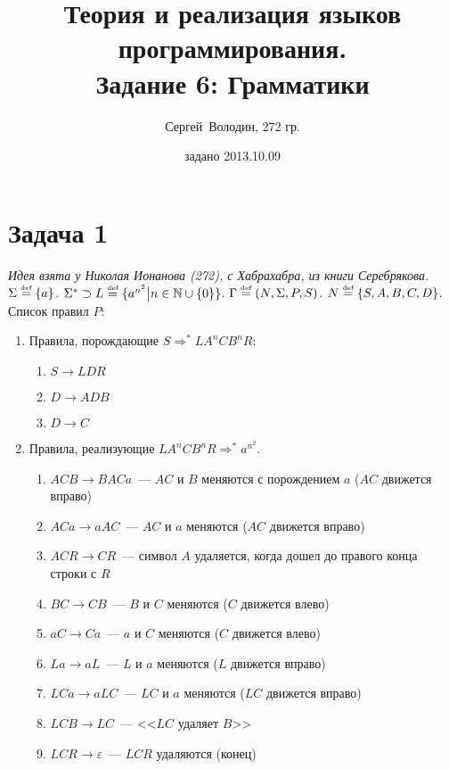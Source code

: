 \documentclass[a4paper]{article}
\title{Теория и реализация языков программирования.\\Задание 6: Грамматики}
\date{задано 2013.10.09}
\author{Сергей~Володин, 272 гр.}
\def\eqdef{\overset{\mbox{\tiny def}}{=}}
\begin{document}
\maketitle
\section*{Задача 1}
{\em Идея взята у Николая Ионанова (272), с Хабрахабра, из книги Серебрякова.}\newline
$\Sigma\eqdef\{a\}$. $\Sigma^*\supset L\eqdef\{a^{n^2}\big|n\in{\mathbb N}\cup \{0\} \}$. $\Gamma\eqdef (N,\Sigma,P,S)$. $N\eqdef \{S,A,B,C,D\}$. Список правил $P$:
\begin{enumerate}[(1)]
\item Правила, порождающие $S\Longrightarrow^* LA^nCB^nR$:\begin{enumerate}[1.]
\item \label{rS} $S\longrightarrow LDR$
\item \label{rDAB} $D\longrightarrow ADB$
\item \label{rDeps} $D\longrightarrow C$
\end{enumerate}
\item Правила, реализующие $LA^nCB^nR\Longrightarrow^* a^{n^2}$.\begin{enumerate}[1.]
\item \label{rACB} $ACB \longrightarrow BACa$~--- $AC$ и $B$ меняются с порождением $a$ ($AC$ движется вправо)
\item \label{rACa} $ACa \longrightarrow aAC$~--- $AC$ и $a$ меняются ($AC$ движется вправо)
\item \label{rACR} $ACR \longrightarrow CR$~--- символ $A$ удаляется, когда дошел до правого конца строки с $R$
\item \label{rBC} $BC \longrightarrow CB$~--- $B$ и $C$ меняются ($C$ движется влево)
\item \label{raC} $aC \longrightarrow Ca$~--- $a$ и $C$ меняются ($C$ движется влево)
\item \label{rLa} $La \longrightarrow aL$~--- $L$ и $a$ меняются ($L$ движется вправо)
\item \label{rLCa} $LCa \longrightarrow aLC$~--- $LC$ и $a$ меняются ($LC$ движется вправо)
\item \label{rLCB}$LCB \longrightarrow LC$~--- <<$LC$ удаляет $B$>>
\item \label{rLCR}$LCR \longrightarrow \varepsilon$~--- $LCR$ удаляются (конец)
\end{enumerate}
\end{enumerate}
\end{document}

